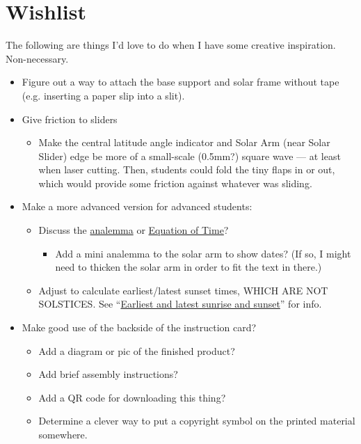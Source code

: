 \documentclass[tikz]{article}
\begin{document}
	\section*{Wishlist}
	The following are things I'd love to do when I have some creative inspiration. Non-necessary. 
	\begin{itemize}
		\item Figure out a way to attach the base support and solar frame without tape (e.g. inserting a paper slip into a slit). 
		\item Give friction to sliders
		\begin{itemize}
			\item Make the central latitude angle indicator and Solar Arm (near Solar Slider) edge be more of a small-scale (0.5mm?) square wave --- at least when laser cutting. Then, students could fold the tiny flaps in or out, which would provide some friction against whatever was sliding.
		\end{itemize}
		\item Make a more advanced version for advanced students:
		\begin{itemize}
			\item Discuss the \href{https://en.wikipedia.org/wiki/Analemma}{analemma} or \href{https://en.wikipedia.org/wiki/Equation_of_time}{Equation of Time}?
			\begin{itemize}
				\item Add a mini analemma to the solar arm to show dates? (If so, I might need to thicken the solar arm in order to fit the text in there.)
			\end{itemize}
			\item Adjust to calculate earliest/latest sunset times, WHICH ARE NOT SOLSTICES. See ``\href{https://en.wikipedia.org/wiki/Analemma#Earliest_and_latest_sunrise_and_sunset}{Earliest and latest sunrise and sunset}'' for info. 
		\end{itemize}
		\item Make good use of the backside of the instruction card? 
		\begin{itemize}
			\item Add a diagram or pic of the finished product?
			\item Add brief assembly instructions?
			\item Add a QR code for downloading this thing? 
			\item Determine a clever way to put a copyright symbol on the printed material somewhere. 
		\end{itemize}

\end{itemize}
\end{document}
